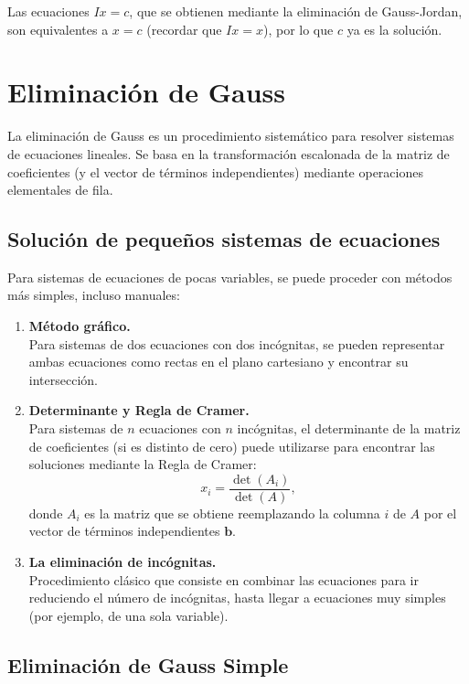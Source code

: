 \documentclass[12pt,letterpaper]{article}
\theoremstyle{definition}
\theoremstyle{plain}
\theoremstyle{remark}
\begin{document}
Las ecuaciones $Ix = c$, que se obtienen mediante la eliminación de Gauss-Jordan, son equivalentes a $x = c$ (recordar que $Ix = x$), por lo que $c$ ya es la solución.

\section{Eliminación de Gauss}

La eliminación de Gauss es un procedimiento sistemático para resolver sistemas de ecuaciones lineales. Se basa en la transformación escalonada de la matriz de coeficientes (y el vector de términos independientes) mediante operaciones elementales de fila.

\subsection{Solución de pequeños sistemas de ecuaciones}

Para sistemas de ecuaciones de pocas variables, se puede proceder con métodos más simples, incluso manuales:

\begin{enumerate}
    \item \textbf{Método gráfico.}\\
    Para sistemas de dos ecuaciones con dos incógnitas, se pueden representar ambas ecuaciones como rectas en el plano cartesiano y encontrar su intersección.

    \item \textbf{Determinante y Regla de Cramer.}\\
    Para sistemas de $n$ ecuaciones con $n$ incógnitas, el determinante de la matriz de coeficientes (si es distinto de cero) puede utilizarse para encontrar las soluciones mediante la Regla de Cramer:
    \[
       x_i = \frac{\det(A_i)}{\det(A)},
    \]
    donde $A_i$ es la matriz que se obtiene reemplazando la columna $i$ de $A$ por el vector de términos independientes $\mathbf{b}$.

    \item \textbf{La eliminación de incógnitas.}\\
    Procedimiento clásico que consiste en combinar las ecuaciones para ir reduciendo el número de incógnitas, hasta llegar a ecuaciones muy simples (por ejemplo, de una sola variable).
\end{enumerate}

\subsection{Eliminación de Gauss Simple}
\end{document}
